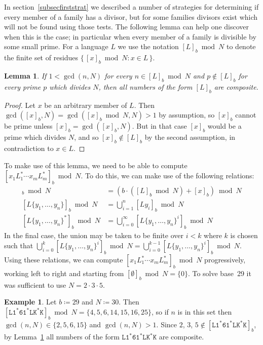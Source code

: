 \documentclass[12pt]{article}
\theoremstyle{plain}
\newtheorem{lemma}[theorem]{Lemma}
\theoremstyle{definition}
\newtheorem{example}[theorem]{Example}
\theoremstyle{remark}
\newcommand{\0}{\mathtt{0}}
\newcommand{\1}{\mathtt{1}}
\newcommand{\2}{\mathtt{2}}
\newcommand{\3}{\mathtt{3}}
\newcommand{\4}{\mathtt{4}}
\newcommand{\5}{\mathtt{5}}
\newcommand{\6}{\mathtt{6}}
\newcommand{\7}{\mathtt{7}}
\newcommand{\8}{\mathtt{8}}
\newcommand{\9}{\mathtt{9}}
\newcommand{\set}[2]{\{\,#1{}:{}#2\,\}}
\begin{document}
In section~\ref{subsecfirststrat} we described a number of strategies for determining if every member of a family has a divisor,
but for some families divisors exist which will not be found using those tests.  The following lemma can help one discover when
this is the case; in particular when every member of a family is divisible by some small prime.  For a language $L$ we use the
notation $[L]_b\bmod N$ to denote the finite set of residues $\set{[x]_b\bmod N}{x\in L}$.
\begin{lemma}\label{lemextdiv}
If\/ $1<\gcd(n,N)$ for every $n\in[L]_b\bmod N$ and $p\notin[L]_b$ for every prime $p$ which divides $N$, then all numbers of the form $[L]_b$ are composite.
\end{lemma}
\begin{proof}
Let $x$ be an arbitrary member of $L$.  Then $\gcd([x]_b,N)=\gcd([x]_b\bmod N,N)>1$ by assumption, so $[x]_b$ cannot be prime unless $[x]_b=\gcd([x]_b,N)$.  But in that case $[x]_b$ would be a prime which divides $N$, and so $[x]_b\notin[L]_b$ by the second assumption, in contradiction to $x\in L$.
\end{proof}
To make use of this lemma, we need to be able to compute $[x_1L_1^*\dotsm x_mL_m^*]_b\bmod N$.  To do this, we can make use of the following relations:
\begin{align*}
[Lx]_b \bmod N &= (b\cdot([L]_b\bmod N)+[x]_b)\bmod N \\
[L\{y_1,\dotsc,y_n\}]_b \bmod N &= \bigcup_{i=1}^n[Ly_i]_b\bmod N \\
[L\{y_1,\dotsc,y_n\}^*]_b \bmod N &= \bigcup_{i=0}^\infty[L\{y_1,\dotsc,y_n\}^i]_b\bmod N
\end{align*}
In the final case, the union may be taken to be finite over $i<k$ where $k$ is chosen such that $\bigcup_{i=0}^k[L\{y_1,\dotsc,y_n\}^i]_b\bmod N=\bigcup_{i=0}^{k-1}[L\{y_1,\dotsc,y_n\}^i]_b\bmod N$.
Using these relations, we can compute $[x_1L_1^*\dotsm x_mL_m^*]_b\bmod N$ progressively, working left to right and starting from $[\emptyset]_b\bmod N = \{0\}$.  To solve base~29 it was sufficient to use $N=2\cdot3\cdot5$.
\begin{example}
Let $b\coloneqq29$ and $N\coloneqq30$. %
Then $[\mathtt{L}\1^*\6\1^*\mathtt{LK}^*\mathtt{K}]_b\bmod N=\{4,5,6,14,15,16,25\}$, so if $n$ is in this set then $\gcd(n,N)\in\{2,5,6,15\}$ and $\gcd(n,N)>1$.  Since $2$, $3$, $5\notin[\mathtt{L}\1^*\6\1^*\mathtt{LK}^*\mathtt{K}]_b$, by Lemma~\ref{lemextdiv} all numbers of the form $\mathtt{L}\1^*\6\1^*\mathtt{LK}^*\mathtt{K}$ are composite.
\end{example}
\end{document}
